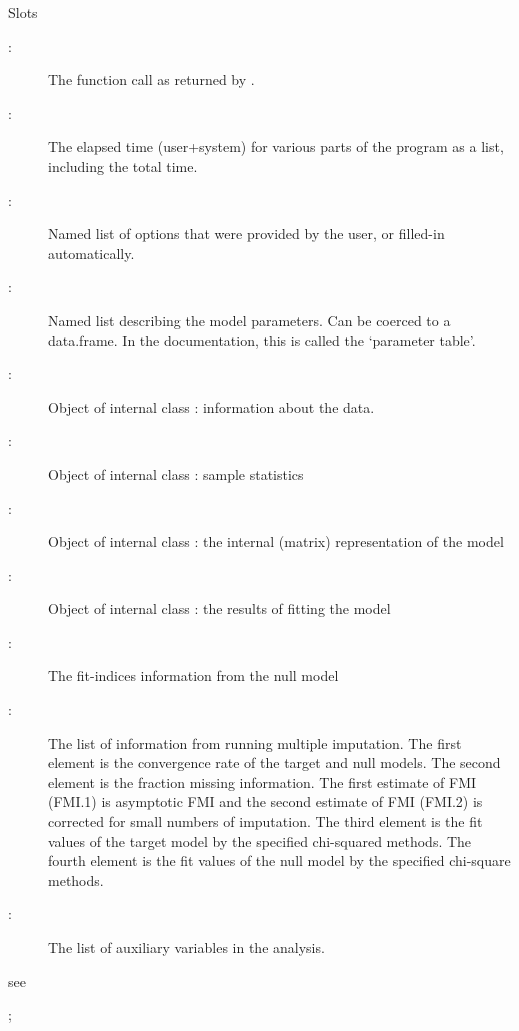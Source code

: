 \documentclass[a4paper]{book}
\begin{document}
\begin{Section}{Slots}
\begin{description}

\item[:] The function call as returned by .
\item[:] The elapsed time (user+system) for various parts of 
the program as a list, including the total time.
\item[:] Named list of options that were provided by
the user, or filled-in automatically.
\item[:] Named list describing the model parameters. Can be coerced to a data.frame. In the documentation, this is called the `parameter table'.
\item[:] Object of internal class : information
about the data.
\item[:] Object of internal class : sample 
statistics
\item[:] Object of internal class : the 
internal (matrix) representation of the model
\item[:] Object of internal class : the 
results of fitting the model
\item[:] The fit-indices information from the null model
\item[:] The list of information from running multiple imputation. The first element is the convergence rate of the target and null models. The second element is the fraction missing information. The first estimate of FMI (FMI.1) is asymptotic FMI and the second estimate of FMI (FMI.2) is corrected for small numbers of imputation. The third element is the fit values of the target model by the specified chi-squared methods. The fourth element is the fit values of the null model by the specified chi-square methods.
\item[:] The list of auxiliary variables in the analysis.

\end{description}

\end{Section}
%
\begin{References}\relax
see 
\end{References}
%
\begin{SeeAlso}\relax
{}; 
\end{SeeAlso}
\end{document}
